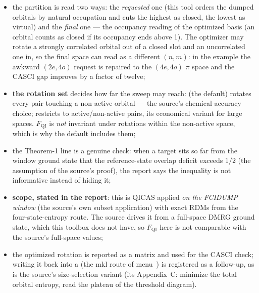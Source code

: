 \begin{readbox}
\begin{itemize}
  \item the partition is read two ways: the \emph{requested} one (this tool
    orders the dumped orbitals by natural occupation and cuts the highest as
    closed, the lowest as virtual) and the \emph{final} one --- the occupancy
    reading of the optimized basis (an orbital counts as closed if its
    occupancy ends above 1).  The optimizer may rotate a strongly correlated
    orbital out of a closed slot and an uncorrelated one in, so the final
    space can read as a different $(n, m)$: in the example the awkward
    $(2e, 4o)$ request is repaired to the $(4e, 4o)$ $\pi$ space and the CASCI
    gap improves by a factor of twelve;
  \item \textbf{the rotation set} decides how far the sweep may reach:
     (the default) rotates every pair touching a non-active
    orbital --- the source's chemical-accuracy choice; 
    restricts to active/non-active pairs, its economical variant for large
    spaces.  $F_{\mathrm{QI}}$ is \emph{not} invariant under rotations within
    the non-active space, which is why the default includes them;
  \item the Theorem-1 line is a genuine check: when a target sits so far from
    the window ground state that the reference-state overlap deficit exceeds
    $1/2$ (the assumption of the source's proof), the report says the
    inequality is not informative instead of hiding it;
  \item \textbf{scope, stated in the report}: this is QICAS applied \emph{on
    the FCIDUMP window} (the source's own subset application) with exact RDMs
    from the four-state-entropy route.  The source drives it from a
    full-space DMRG ground state, which this toolbox does not have, so
    $F_{\mathrm{QI}}$ here is not comparable with the source's full-space
    values;
  \item the optimized rotation is reported as a matrix and used for the CASCI
    check; writing it back into a  (the mkl route of
    menu~) is registered as a follow-up, as is the source's
    size-selection variant (its Appendix~C: minimize the total orbital
    entropy, read the plateau of the threshold diagram).
\end{itemize}
\end{readbox}
